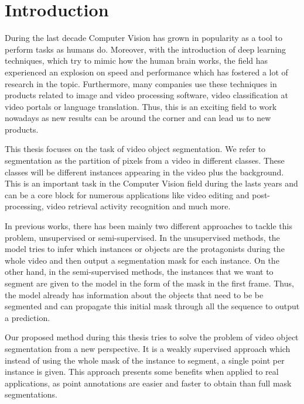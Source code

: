 
\chapter{Introduction}
\label{cha:introduction}

During the last decade Computer Vision has grown in popularity as a tool to perform tasks as humans do.
Moreover, with the introduction of deep learning techniques, which try to mimic how the human brain works, the field has experienced an explosion on speed and performance which has fostered a lot of research in the topic.
Furthermore, many companies use these techniques in products related to image and video processing software, video classification at video portals or language translation.
Thus, this is an exciting field to work nowadays as new results can be around the corner and can lead us to new products.


This thesis focuses on the task of video object segmentation.
We refer to segmentation as the partition of pixels from a video in different classes.
These classes will be different instances appearing in the video plus the background.
This is an important task in the Computer Vision field during the lasts years and can be a core block for numerous applications like video editing and post-processing, video retrieval activity recognition and much more.

In previous works, there has been mainly two different approaches to tackle this problem, unsupervised or semi-supervised.
In the unsupervised methods, the model tries to infer which instances or objects are the protagonists during the whole video and then output a segmentation mask for each instance.
On the other hand, in the semi-supervised methods, the instances that we want to segment are given to the model in the form of the mask in the first frame.
Thus, the model already has information about the objects that need to be be segmented and can propagate this initial mask through all the sequence to output a prediction.

Our proposed method during this thesis tries to solve the problem of video object segmentation from a new perspective.
It is a weakly supervised approach which instead of using the whole mask of the instance to segment, a single point per instance is given.
This approach presents some benefits when applied to real applications, as point annotations are easier and faster to obtain than full mask segmentations.

